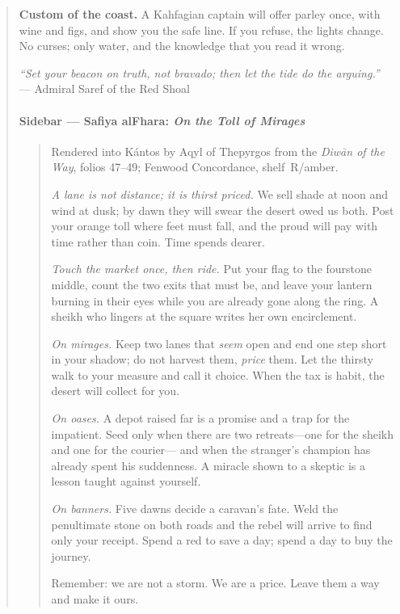 \documentclass[11pt]{article}
\begin{document}
\begin{quote}
\medskip
\noindent\textbf{Custom of the coast.} A Kahfagian captain will offer parley once, with wine and figs, and show you the safe line. If you refuse, the lights change. No curses; only water, and the knowledge that you read it wrong.

\medskip
\noindent\textit{“Set your beacon on truth, not bravado; then let the tide do the arguing.”} — Admiral Saref of the Red Shoal

\paragraph*{Sidebar — Safiya al\textendash Fhara: \textit{On the Toll of Mirages}}
\begin{quote}\small
Rendered into Kántos by Aqyl of Thepyrgos from the \textit{Diwān of the Way}, folios 47–49; Fenwood Concordance, shelf~R/amber.

\medskip
\textit{A lane is not distance; it is thirst priced.} We sell shade at noon and wind at dusk; by dawn they will swear the desert owed us both. Post your orange toll where feet must fall, and the proud will pay with time rather than coin. Time spends dearer.

\medskip
\textit{Touch the market once, then ride.} Put your flag to the four\textendash stone middle, count the two exits that must be, and leave your lantern burning in their eyes while you are already gone along the ring. A sheikh who lingers at the square writes her own encirclement.

\medskip
\textit{On mirages.} Keep two lanes that \emph{seem} open and end one step short in your shadow; do not harvest them, \emph{price} them. Let the thirsty walk to your measure and call it choice. When the tax is habit, the desert will collect for you.

\medskip
\textit{On oases.} A depot raised far is a promise and a trap for the impatient. Seed only when there are two retreats—one for the sheikh and one for the courier— and when the stranger’s champion has already spent his suddenness. A miracle shown to a skeptic is a lesson taught against yourself.

\medskip
\textit{On banners.} Five dawns decide a caravan’s fate. Weld the penultimate stone on both roads and the rebel will arrive to find only your receipt. Spend a red to save a day; spend a day to buy the journey.

\medskip
Remember: we are not a storm. We are a price. Leave them a way and make it ours.
\end{quote}


\end{quote}
\end{document}
